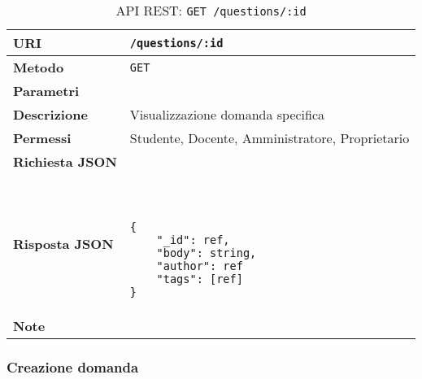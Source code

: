         \begin{table}[H]
            \begin{center}
                \begin{tabular}{p{} p{}}
                    \toprule
                    \textbf{URI} & \texttt{/questions/:id} \\ \midrule
                    \textbf{Metodo} & \texttt{GET} \\ \midrule
                    \textbf{Parametri} & \\ \midrule
                    \textbf{Descrizione} & Visualizzazione domanda specifica \\ \midrule
                    \textbf{Permessi} & Studente, Docente, Amministratore, Proprietario  \\ \midrule
                    \textbf{Richiesta JSON} & \\ \midrule
                    \textbf{Risposta JSON} & \
                        \begin{lstlisting}[basicstyle={\ttfamily}]
{
    "_id": ref,
    "body": string,
    "author": ref
    "tags": [ref]
}
                        \end{lstlisting}
                        \\ \midrule
                    \textbf{Note} & \\
                    \bottomrule
                \end{tabular}
                \caption{API REST: \texttt{GET /questions/:id}}
            \end{center}
        \end{table}

    \subsubsection{Creazione domanda}

